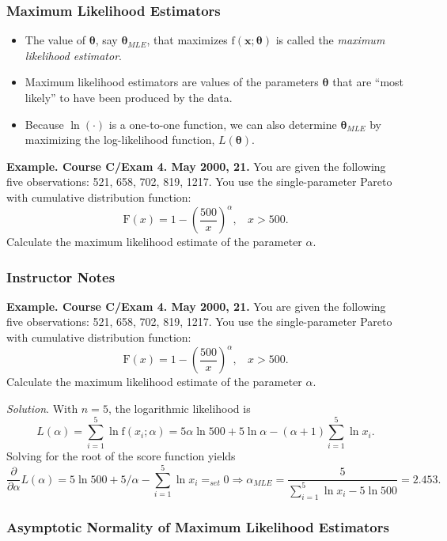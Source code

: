 \documentclass[]{book}
\begin{document}
\subsubsection{Maximum Likelihood
Estimators}\label{maximum-likelihood-estimators}

\begin{itemize}
\item
  The value of \(\boldsymbol \theta\), say \(\boldsymbol \theta_{MLE}\),
  that maximizes \(\mathrm{f}(\mathbf{x};\boldsymbol \theta)\) is called
  the \emph{maximum likelihood estimator}.
\item
  Maximum likelihood estimators are values of the parameters
  \(\boldsymbol \theta\) that are ``most likely'' to have been produced
  by the data.
\item
  Because \(\ln(\cdot)\) is a one-to-one function, we can also determine
  \(\boldsymbol \theta_{MLE}\) by maximizing the log-likelihood
  function, \(L(\boldsymbol \theta)\).
\end{itemize}

\textbf{Example. Course C/Exam 4. May 2000, 21.} You are given the
following five observations: 521, 658, 702, 819, 1217. You use the
single-parameter Pareto with cumulative distribution function:
\[\mathrm{F}(x) = 1- \left(\frac{500}{x}\right)^{\alpha}, ~~~~ x>500 .\]
Calculate the maximum likelihood estimate of the parameter \(\alpha\).

\subsubsection{Instructor Notes}\label{instructor-notes}

\textbf{Example. Course C/Exam 4. May 2000, 21.} You are given the
following five observations: 521, 658, 702, 819, 1217. You use the
single-parameter Pareto with cumulative distribution function:
\[\mathrm{F}(x) = 1- \left(\frac{500}{x}\right)^{\alpha}, ~~~~ x>500 .\]
Calculate the maximum likelihood estimate of the parameter \(\alpha\).

\emph{Solution}. With \(n=5\), the logarithmic likelihood is
\[L(\alpha ) =  \sum_{i=1}^5 \ln \mathrm{f}(x_i;\alpha ) =  5 \alpha \ln 500 + 5 \ln \alpha
-(\alpha+1) \sum_{i=1}^5 \ln x_i.\] Solving for the root of the score
function yields
\[\frac{ \partial}{\partial \alpha } L(\alpha ) =    5  \ln 500 + 5 / \alpha -  \sum_{i=1}^5 \ln x_i
=_{set} 0 \Rightarrow \alpha_{MLE} = \frac{5}{\sum_{i=1}^5 \ln x_i - 5  \ln 500 } = 2.453 .\]

\subsubsection{Asymptotic Normality of Maximum Likelihood
Estimators}\label{asymptotic-normality-of-maximum-likelihood-estimators}
\end{document}
